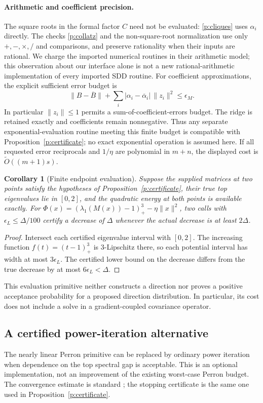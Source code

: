 \documentclass[11pt]{amsart}
\newtheorem{corollary}[theorem]{Corollary}
\theoremstyle{definition}\newtheorem{definition}[theorem]{Definition}
\theoremstyle{remark}\newtheorem{remark}[theorem]{Remark}
\numberwithin{equation}{section}
\begin{document}
\paragraph{Arithmetic and coefficient precision.}
The square roots in the formal factor $C$ need not be evaluated:
\eqref{p:cliques} uses $\alpha_i$ directly.  The checks
\eqref{p:collatz} and the non-square-root normalization use only
$+,-,\times,/$ and comparisons, and preserve rationality when their
inputs are rational.  We charge the imported numerical routines in their
arithmetic model; this observation about our interface alone is not a
new rational-arithmetic implementation of every imported SDD routine.
For coefficient approximations, the explicit sufficient error budget is
\[
 \|B-\overline B\|+
 \sum_i|\alpha_i-\overline\alpha_i|\,\|z_i\|^2\le\epsilon_M.
\]
In particular $\|z_i\|\le1$ permits a sum-of-coefficient-errors budget.
The ridge is retained exactly and coefficients remain nonnegative.
Thus any separate exponential-evaluation routine meeting this finite
budget is compatible with Proposition~\ref{p:certificate}; no exact
exponential operation is assumed here.  If all requested error
reciprocals and $1/\eta$ are polynomial in $m+n$, the displayed cost is
$\widetilde O((m+1)s)$.

\begin{corollary}[Finite endpoint evaluation]\label{p:endpoint}
Suppose the supplied matrices at two points satisfy the hypotheses of
Proposition~\ref{p:certificate}, their true top eigenvalues lie in $[0,2]$,
and the quadratic energy at both points is available exactly.  For
$\Phi(x)=(\lambda_1(M(x))-1)_+^3-\eta\|x\|^2$, two calls with
$\epsilon_L\le\Delta/100$ certify a decrease of $\Delta$ whenever the
actual decrease is at least $2\Delta$.
\end{corollary}
\begin{proof}
Intersect each certified eigenvalue interval with $[0,2]$.
The increasing function $f(t)=(t-1)_+^3$ is $3$-Lipschitz there, so each
potential interval has width at most $3\epsilon_L$.  The certified
lower bound on the decrease differs from the true decrease by at most
$6\epsilon_L<\Delta$.
\end{proof}
This evaluation primitive neither constructs a direction nor proves a
positive acceptance probability for a proposed direction distribution.
In particular, its cost does not include a solve in a gradient-coupled
covariance operator.


\subsection{A certified power-iteration alternative}
\label{new:power}
The nearly linear Perron primitive can be replaced by ordinary power
iteration when dependence on the top spectral gap is acceptable.
This is an optional implementation, not an improvement of the existing
worst-case Perron budget. The convergence estimate is standard
\cite[Section~4.1]{SaadEig}; the stopping certificate is the same one used
in Proposition~\ref{p:certificate}.
\end{document}
